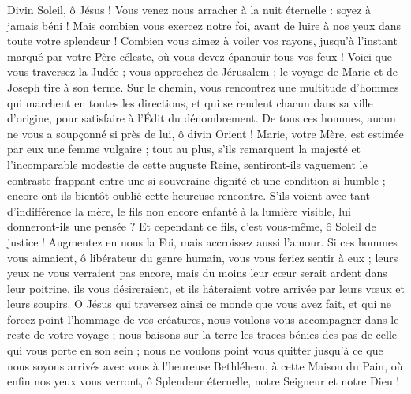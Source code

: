 \documentclass[%
fontsize=10%
,a6paper%
,DIV=13%
]{scrartcl}
\begin{document}
Divin Soleil, ô Jésus ! Vous venez nous arracher à la nuit éternelle : soyez à jamais béni ! Mais combien vous exercez notre foi, avant de luire à nos yeux dans toute votre splendeur ! Combien vous aimez à voiler vos rayons, jusqu’à l’instant marqué par votre Père céleste, où vous devez épanouir tous vos feux ! Voici que vous traversez la Judée ; vous approchez de Jérusalem ; le voyage de Marie et de Joseph tire à son terme. Sur le chemin, vous rencontrez une multitude d’hommes qui marchent en toutes les directions, et qui se rendent chacun dans sa ville d’origine, pour satisfaire à l’Édit du dénombrement. De tous ces hommes, aucun ne vous a soupçonné si près de lui, ô divin Orient ! Marie, votre Mère, est estimée par eux une femme vulgaire ; tout au plus, s’ils remarquent la majesté et l’incomparable modestie de cette auguste Reine, sentiront-ils vaguement le contraste frappant entre une si souveraine dignité et une condition si humble ; encore ont-ils bientôt oublié cette heureuse rencontre. S’ils voient avec tant d’indifférence la mère, le fils non encore enfanté à la lumière visible, lui donneront-ils une pensée ? Et cependant ce fils, c’est vous-même, ô Soleil de justice ! Augmentez en nous la Foi, mais accroissez aussi l’amour. Si ces hommes vous aimaient, ô libérateur du genre humain, vous vous feriez sentir à eux ; leurs yeux ne vous verraient pas encore, mais du moins leur cœur serait ardent dans leur poitrine, ils vous désireraient, et ils hâteraient votre arrivée par leurs vœux et leurs soupirs. O Jésus qui traversez ainsi ce monde que vous avez fait, et qui ne forcez point l’hommage de vos créatures, nous voulons vous accompagner dans le reste de votre voyage ; nous baisons sur la terre les traces bénies des pas de celle qui vous porte en son sein ; nous ne voulons point vous quitter jusqu’à ce que nous soyons arrivés avec vous à l’heureuse Bethléhem, à cette Maison du Pain, où enfin nos yeux vous verront, ô Splendeur éternelle, notre Seigneur et notre Dieu !

\end{document}
